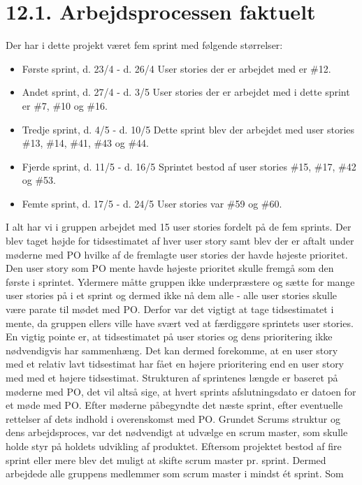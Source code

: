 \documentclass[11pt]{report}
\begin{document}
\section*{12.1. Arbejdsprocessen faktuelt}
Der har i dette projekt været fem sprint med følgende størrelser:
\begin{itemize}
\renewcommand\labelitemi{--}
\item Første sprint, d. 23/4 - d. 26/4
User stories der er arbejdet med er \#12.
\item Andet sprint, d. 27/4 - d. 3/5 
User stories der er arbejdet med i dette sprint er \#7, \#10 og \#16.
\item Tredje sprint, d. 4/5 - d. 10/5
Dette sprint blev der arbejdet med user stories \#13, \#14, \#41, \#43 og \#44.
\item Fjerde sprint, d. 11/5 - d. 16/5
Sprintet bestod af user stories \#15, \#17, \#42 og \#53.
\item Femte sprint, d. 17/5 - d. 24/5
User stories var \#59 og \#60.
\end{itemize}
I alt har vi i gruppen arbejdet med 15 user stories fordelt på de fem sprints. Der blev taget højde for tidsestimatet af hver user story samt blev der er aftalt under møderne med PO hvilke af de fremlagte user stories der havde højeste prioritet.
Den user story som PO mente havde højeste prioritet skulle fremgå som den første i sprintet. Ydermere måtte gruppen ikke underpræstere og sætte for mange user stories på i et sprint og dermed ikke nå dem alle - alle user stories skulle være parate til mødet med PO. Derfor var det vigtigt at tage tidsestimatet i mente, da gruppen ellers ville have svært ved at færdiggøre sprintets user stories.
En vigtig pointe er, at tidsestimatet på user stories og dens prioritering ikke nødvendigvis har sammenhæng. Det kan dermed forekomme, at en user story med et relativ lavt tidsestimat har fået en højere prioritering end en user story med med et højere tidsestimat.
Strukturen af sprintenes længde er baseret på møderne med PO, det vil altså sige, at hvert sprints afslutningsdato er datoen for et møde med PO. Efter møderne påbegyndte det næste sprint, efter eventuelle rettelser af dets indhold i overenskomst med PO.
Grundet Scrums struktur og dens arbejdsproces, var det nødvendigt at
udvælge en scrum master, som skulle holde styr på holdets udvikling af
produktet. Eftersom projektet bestod af fire sprint eller mere blev
det muligt at skifte scrum master pr. sprint. Dermed arbejdede alle
gruppens medlemmer som scrum master i mindst ét sprint. Som
\end{document}
